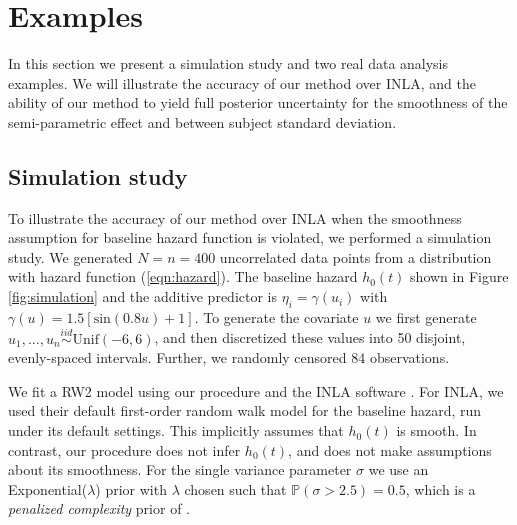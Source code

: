\documentclass[]{article}
\begin{document}
\section{Examples}\label{sec:example}

In this section we present a simulation study and two real data analysis examples. We will illustrate the accuracy of our method over INLA, and the ability of our method to yield full posterior uncertainty for the smoothness of the semi-parametric effect and between subject standard deviation.

\subsection{Simulation study}

To illustrate the accuracy of our method over INLA when the smoothness assumption for baseline hazard function is violated, we performed a simulation study. We generated $N = n = 400$ uncorrelated data points from a distribution with hazard function (\ref{eqn:hazard}). The baseline hazard $h_{0}(t)$ shown in Figure \ref{fig:simulation} and the additive predictor is $\eta_{i} = \gamma\left(u_{i}\right)$ with $\gamma(u) = 1.5 [ \text{sin}(0.8u) + 1 ]$. To generate the covariate $u$ we first generate $u_{1},\ldots,u_{n}\overset{iid}{\sim}\text{Unif}(-6,6)$, and then discretized these values into 50 disjoint, evenly-spaced intervals. Further, we randomly censored $84$ observations. 

We fit a RW2 model using our procedure and the INLA software \citep{inla}. For INLA, we used their default first-order random walk model for the baseline hazard, run under its default settings. This implicitly assumes that $h_{0}(t)$ is smooth. In contrast, our procedure does not infer $h_{0}(t)$, and does not make assumptions about its smoothness. For the single variance parameter $\sigma$ we use an Exponential($\lambda$) prior with $\lambda$ chosen such that $\mathbb{P}\left( \sigma > 2.5\right) = 0.5$, which is a \emph{penalized complexity} prior of \citep{pcprior}.
\end{document}
